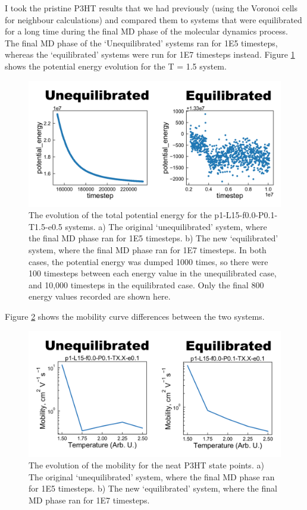 \documentclass[12pt]{article}
\begin{document}
I took the pristine P3HT results that we had previously (using the Voronoi cells for neighbour calculations) and compared them to systems that were equilibrated for a long time during the final MD phase of the molecular dynamics process.
The final MD phase of the `Unequilibrated' systems ran for 1E5 timesteps, whereas the `equilibrated' systems were run for 1E7 timesteps instead.
Figure \ref{fig:Energy} shows the potential energy evolution for the T = 1.5 system.


\begin{figure}[h!]\centering
	\includegraphics[width=\textwidth]{Figures/PE.pdf}
    \caption{The evolution of the total potential energy for the p1-L15-f0.0-P0.1-T1.5-e0.5 systems.
    a) The original `unequilibrated' system, where the final MD phase ran for 1E5 timesteps.
    b) The new `equilibrated' system, where the final MD phase ran for 1E7 timesteps.
    In both cases, the potential energy was dumped 1000 times, so there were 100 timesteps between each energy value in the unequilibrated case, and 10,000 timesteps in the equilibrated case.
    Only the final 800 energy values recorded are shown here.}
	\label{fig:Energy}
\end{figure}


Figure \ref{fig:Mobility} shows the mobility curve differences between the two systems.


\begin{figure}[h!]\centering
	\includegraphics[width=\textwidth]{Figures/Mob.pdf}
    \caption{The evolution of the mobility for the neat P3HT state points.
    a) The original `unequilibrated' system, where the final MD phase ran for 1E5 timesteps.
    b) The new `equilibrated' system, where the final MD phase ran for 1E7 timesteps.
}
	\label{fig:Mobility}
\end{figure}
\end{document}
